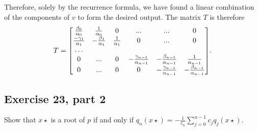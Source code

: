 \begin{solution}
     Therefore, solely by the recurrence formula, we have found a linear combination of the components of $v$ to form the desired output. The matrix $T$ is therefore
    \[T = \mqty[
        \frac{\beta_0}{\alpha_0}&\frac{1}{\alpha_0}&0&...&...&0\\
        \frac{-\gamma_1}{\alpha_1}&-\frac{\beta_1}{\alpha_1}& \frac{1}{\alpha_1}&0&...&0\\
        \dots\\
        0&...&0&-\frac{\gamma_{n-1}}{\alpha_{n-1}}&-\frac{\beta_{n-1}}{\alpha_{n-1}}&\frac{1}{\alpha_{n-1}}\\
        0&...&0&0&-\frac{\gamma_{n-1}}{\alpha_{n-1}}&-\frac{\beta_{n-1}}{\alpha_{n-1}}
        ].\]
\end{solution}

\newpage
\subsection{Exercise 23, part 2}
Show that $x\star$ is a root of $p$ if and only if $q_n(x\star) = -\frac{1}{c_n}\sum_{j = 0}^{n-1}c_jq_j(x\star).$
\partbreak

